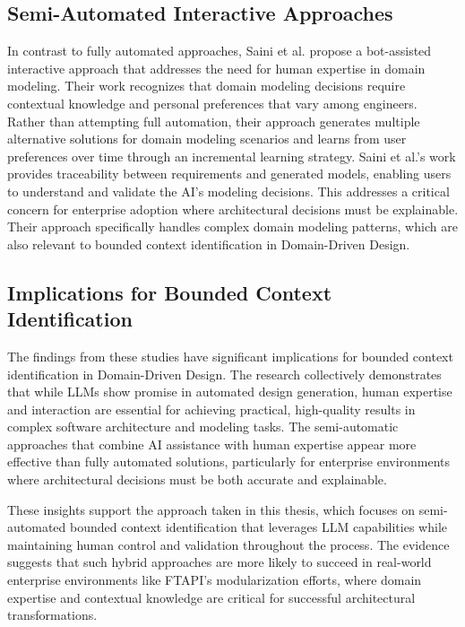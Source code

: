 \subsection{Semi-Automated Interactive Approaches}

In contrast to fully automated approaches, Saini et al. \autocite{Saini2022} propose a bot-assisted interactive approach that addresses the need for human expertise in domain modeling. Their work recognizes that domain modeling decisions require contextual knowledge and personal preferences that vary among engineers. Rather than attempting full automation, their approach generates multiple alternative solutions for domain modeling scenarios and learns from user preferences over time through an incremental learning strategy. Saini et al.'s work provides traceability between requirements and generated models, enabling users to understand and validate the AI's modeling decisions. This addresses a critical concern for enterprise adoption where architectural decisions must be explainable. Their approach specifically handles complex domain modeling patterns, which are also relevant to bounded context identification in Domain-Driven Design.

\subsection{Implications for Bounded Context Identification}

The findings from these studies have significant implications for bounded context identification in Domain-Driven Design. The research collectively demonstrates that while LLMs show promise in automated design generation, human expertise and interaction are essential for achieving practical, high-quality results in complex software architecture and modeling tasks. The semi-automatic approaches that combine AI assistance with human expertise appear more effective than fully automated solutions, particularly for enterprise environments where architectural decisions must be both accurate and explainable.

These insights support the approach taken in this thesis, which focuses on semi-automated bounded context identification that leverages LLM capabilities while maintaining human control and validation throughout the process. The evidence suggests that such hybrid approaches are more likely to succeed in real-world enterprise environments like FTAPI's modularization efforts, where domain expertise and contextual knowledge are critical for successful architectural transformations.

